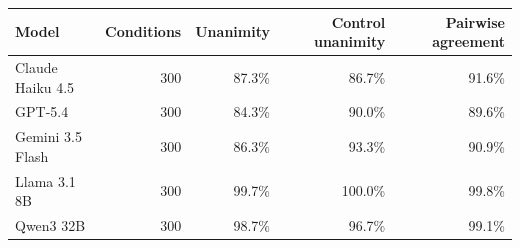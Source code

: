 \begin{tabular}{lrrrr}
\toprule
Model & Conditions & Unanimity & Control unanimity & Pairwise agreement \\
\midrule
Claude Haiku 4.5 & 300 & 87.3\% & 86.7\% & 91.6\% \\
GPT-5.4 & 300 & 84.3\% & 90.0\% & 89.6\% \\
Gemini 3.5 Flash & 300 & 86.3\% & 93.3\% & 90.9\% \\
Llama 3.1 8B & 300 & 99.7\% & 100.0\% & 99.8\% \\
Qwen3 32B & 300 & 98.7\% & 96.7\% & 99.1\% \\
\bottomrule
\end{tabular}

